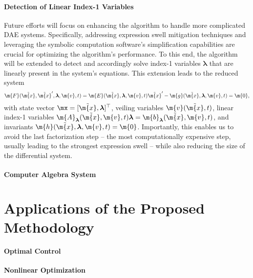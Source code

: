 \paragraph{Detection of Linear Index-1 Variables}

Future efforts will focus on enhancing the algorithm to handle more complicated \ac{DAE} systems. Specifically, addressing expression swell mitigation techniques and leveraging the symbolic computation software's simplification capabilities are crucial for optimizing the algorithm's performance. To this end, the algorithm will be extended to detect and accordingly solve index-1 variables $\boldsymbol{\lambda}$ that are linearly present in the system's equations. This extension leads to the reduced system
%
\begin{equation*}
  \m{F}(\tilde{\m{x}}, \tilde{\m{x}}^{\prime}, \boldsymbol{\lambda}, \m{v}, t) = \m{E}(\tilde{\m{x}}, \boldsymbol{\lambda}, \m{v}, t) \tilde{\m{x}}^{\prime} - \m{g}(\tilde{\m{x}}, \boldsymbol{\lambda}, \m{v}, t) = \m{0} \text{,}
\end{equation*}
%
with state vector $\mx = [\tilde{\m{x}}, \boldsymbol{\lambda}]^\top$, veiling variables $\m{v}(\tilde{\m{x}}, t)$, linear index-1 variables $\m{A}_{\boldsymbol{\lambda}}(\tilde{\m{x}}, \m{v}, t) \boldsymbol{\lambda} = \m{b}_{\boldsymbol{\lambda}}(\tilde{\m{x}}, \m{v}, t)$, and invariants $\m{h}(\tilde{\m{x}}, \boldsymbol{\lambda}, \m{v}, t) = \m{0}$. Importantly, this enables us to avoid the last factorization step -- the most computationally expensive step, usually leading to the strongest expression swell -- while also reducing the size of the differential system.

\paragraph{Computer Algebra System}



\section{Applications of the Proposed Methodology}

\paragraph{Optimal Control}

\paragraph{Nonlinear Optimization}


